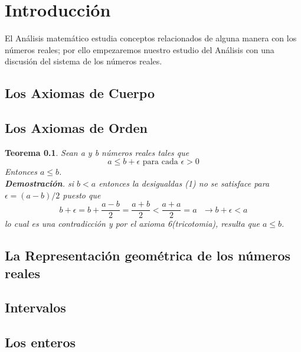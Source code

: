 \documentclass{book}
\newcounter{Teorema}
\numberwithin{equation}{section}
\theoremstyle{plain}  %
\newtheorem{thm}{Teorema}[section]
\begin{document}
    \chapter*{Introducción}
    El Análisis matemático estudia conceptos relacionados de alguna manera con los números reales; 
    por ello empezaremos nuestro estudio del Análisis con una discusión del sistema de los números 
    reales. 
    \\ 
    \section{Los Axiomas de Cuerpo}
    
    \section{Los Axiomas de Orden}
    \begin{thm}
        Sean a y b números reales tales que 
        \begin{equation}
            a \leq b + \epsilon \text{ para cada } \epsilon > 0
        \end{equation}
        Entonces $a \leq b$. 
        \\ 
        \textbf{Demostración}. si $b<a$ entonces la desigualdas (1) no se satisface para $\epsilon = (a-b)/2$
        puesto que
        \begin{equation*}
            b + \epsilon = b + \frac{a-b}{2} = \frac{a+b}{2} < \frac{a+a}{2}=a \text{ } \to  b+\epsilon <a
        \end{equation*}
        lo cual es una contradicción y por el axioma 6(tricotomia), resulta que $a\leq b$. 
        
    \end{thm}
    \section{La Representación geométrica de los números reales}
    \section{Intervalos}
    \section{Los enteros}
\end{document}
